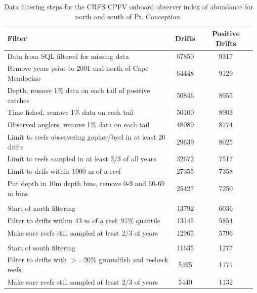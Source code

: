\documentclass[12pt,]{article}
\begin{document}
\begin{table}[ht]
\centering
\caption{Data filtering steps for the CRFS CPFV onboard observer 
                                        index of abundance for north and south of Pt. Conception.} 
\label{tab:Fleet6_7_Filter}
\begin{tabular}{lcc}
  \hline
Filter & Drifts & Positive Drifts \\ 
  \hline
Data from SQL filtered for missing data & 67850 & 9317 \\ 
  Remove years prior to 2001 and north of Cape Mendocino & 64448 & 9129 \\ 
  Depth, remove 1\% data on each tail of positive catches & 50846 & 8955 \\ 
  Time fished, remove 1\% data on each tail & 50100 & 8903 \\ 
  Observed anglers, remove 1\% data on each tail & 48089 & 8774 \\ 
  Limit to reefs observering gopher/byel in at least 20 drifts & 29639 & 8025 \\ 
  Limit to reefs sampled in at least 2/3 of all years & 32672 & 7517 \\ 
  Limit to drifs within 1000 m of a reef & 27355 & 7358 \\ 
  Put depth in 10m depth bins, remove 0-9 and 60-69 m bins & 25427 & 7250 \\ 
   &  &  \\ 
  Start of north filtering & 13792 & 6036 \\ 
  Filter to drifts within 43 m of a reef, 97\% quantile & 13145 & 5854 \\ 
  Make sure reefs still sampled at least 2/3 of years & 12965 & 5796 \\ 
   &  &  \\ 
  Start of south filtering & 11635 & 1277 \\ 
  Filter to drifts with $>$=20\% groundfish and recheck reefs & 5495 & 1171 \\ 
  Make sure reefs still sampled at least 2/3 of years & 5440 & 1132 \\ 
   \hline
\end{tabular}
\end{table}

\clearpage
\newpage
\end{document}
